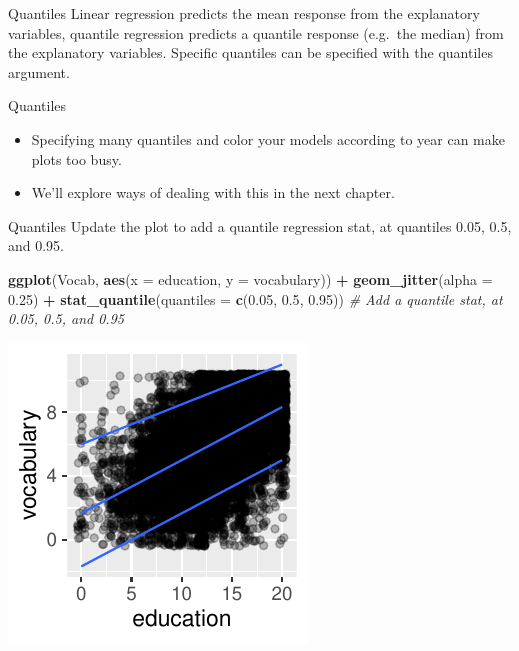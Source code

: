 \documentclass[
  ignorenonframetext,
]{beamer}
\newenvironment{Shaded}{\begin{snugshade}}{\end{snugshade}}
\newcommand{\AttributeTok}[1]{\textcolor[rgb]{0.13,0.29,0.53}{#1}}
\newcommand{\CommentTok}[1]{\textcolor[rgb]{0.56,0.35,0.01}{\textit{#1}}}
\newcommand{\FloatTok}[1]{\textcolor[rgb]{0.00,0.00,0.81}{#1}}
\newcommand{\FunctionTok}[1]{\textcolor[rgb]{0.13,0.29,0.53}{\textbf{#1}}}
\newcommand{\NormalTok}[1]{#1}
\newcommand{\SpecialCharTok}[1]{\textcolor[rgb]{0.81,0.36,0.00}{\textbf{#1}}}
\begin{document}
\begin{frame}{Quantiles}
\label{quantiles-1}
Linear regression predicts the mean response from the explanatory
variables, quantile regression predicts a quantile response (e.g.~the
median) from the explanatory variables. Specific quantiles can be
specified with the quantiles argument.
\end{frame}

\begin{frame}{Quantiles}
\label{quantiles-2}
\begin{itemize}
\item
  Specifying many quantiles and color your models according to year can
  make plots too busy.
\item
  We'll explore ways of dealing with this in the next chapter.
\end{itemize}
\end{frame}

\begin{frame}[fragile]{Quantiles}
\label{quantiles-3}
Update the plot to add a quantile regression stat, at quantiles 0.05,
0.5, and 0.95.


\begin{Shaded}
\begin{Highlighting}[]
\FunctionTok{ggplot}\NormalTok{(Vocab, }\FunctionTok{aes}\NormalTok{(}\AttributeTok{x =}\NormalTok{ education, }\AttributeTok{y =}\NormalTok{ vocabulary)) }\SpecialCharTok{+} \FunctionTok{geom\_jitter}\NormalTok{(}\AttributeTok{alpha =} \FloatTok{0.25}\NormalTok{) }\SpecialCharTok{+}
    \FunctionTok{stat\_quantile}\NormalTok{(}\AttributeTok{quantiles =} \FunctionTok{c}\NormalTok{(}\FloatTok{0.05}\NormalTok{, }\FloatTok{0.5}\NormalTok{, }\FloatTok{0.95}\NormalTok{))  }\CommentTok{\# Add a quantile stat, at 0.05, 0.5, and 0.95}
\end{Highlighting}
\end{Shaded}

\begin{center}\includegraphics[width=0.5\linewidth]{Figs/unnamed-chunk-18-1} \end{center}
\end{frame}
\end{document}
